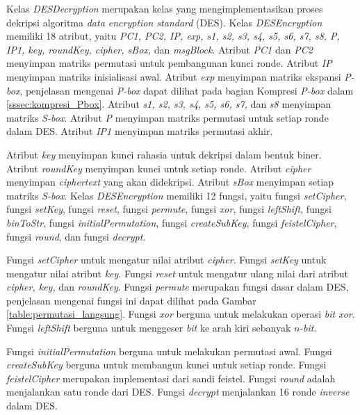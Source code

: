 Kelas \textit{DESDecryption} merupakan kelas yang mengimplementasikan proses dekripsi algoritma \textit{data encryption standard} (DES). Kelas \textit{DESEncryption} memiliki 18 atribut, yaitu \textit{PC1, PC2, IP, exp, s1, s2, s3, s4, s5, s6, s7, s8, P, IP1, key, roundKey, cipher, sBox,} dan \textit{msgBlock}. Atribut \textit{PC1} dan \textit{PC2} menyimpan matriks permutasi untuk pembangunan kunci ronde. Atribut \textit{IP} menyimpan matriks inisialisasi awal. Atribut \textit{exp} menyimpan matriks ekspansi \textit{P-box}, penjelasan mengenai \textit{P-box} dapat dilihat pada bagian Kompresi \textit{P-box} dalam \ref{sssec:kompresi_Pbox}. Atribut \textit{s1, s2, s3, s4, s5, s6, s7,} dan \textit{s8} menyimpan matriks \textit{S-box}. Atribut \textit{P} menyimpan matriks permutasi untuk setiap ronde dalam DES. Atribut \textit{IP1} menyimpan matriks permutasi akhir.

Atribut \textit{key} menyimpan kunci rahasia untuk dekripsi dalam bentuk biner. Atribut \textit{roundKey} menyimpan kunci untuk setiap ronde. Atribut \textit{cipher} menyimpan \textit{ciphertext} yang akan didekripsi. Atribut \textit{sBox} menyimpan setiap matriks \textit{S-box}. Kelas \textit{DESEncryption} memiliki 12 fungsi, yaitu fungsi \textit{setCipher}, fungsi \textit{setKey}, fungsi \textit{reset}, fungsi \textit{permute}, fungsi \textit{xor}, fungsi \textit{leftShift}, fungsi \textit{binToStr}, fungsi \textit{initialPermutation}, fungsi \textit{createSubKey}, fungsi \textit{feistelCipher}, fungsi \textit{round}, dan fungsi \textit{decrypt}.

Fungsi \textit{setCipher} untuk mengatur nilai atribut \textit{cipher}. Fungsi \textit{setKey} untuk mengatur nilai atribut \textit{key}. Fungsi \textit{reset} untuk mengatur ulang nilai dari atribut \textit{cipher, key,} dan \textit{roundKey}. Fungsi \textit{permute} merupakan fungsi dasar dalam DES, penjelasan mengenai fungsi ini dapat dilihat pada Gambar \ref{table:permutasi_langsung}. Fungsi \textit{xor} berguna untuk melakukan operasi \textit{bit xor}. Fungsi \textit{leftShift} berguna untuk menggeser \textit{bit} ke arah kiri sebanyak \begin{math}n\end{math}-\textit{bit}.

Fungsi \textit{initialPermutation} berguna untuk melakukan permutasi awal. Fungsi \textit{createSubKey} berguna untuk membangun kunci untuk setiap ronde. Fungsi \textit{feistelCipher} merupakan implementasi dari sandi feistel. Fungsi \textit{round} adalah menjalankan satu ronde dari DES. Fungsi \textit{decrypt} menjalankan 16 ronde \textit{inverse} dalam DES.

